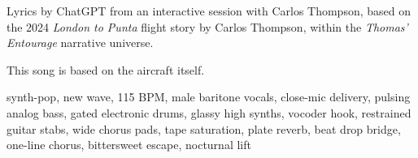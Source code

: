
\begin{notes}
Lyrics by ChatGPT from an interactive session with Carlos Thompson, %
based on the 2024 \emph{London to Punta} flight story by Carlos Thompson, within the \emph{Thomas’ Entourage} narrative universe.

This song is based on the aircraft itself.
\end{notes}
\begin{style}
synth-pop, new wave, 115 BPM, male baritone vocals, close-mic delivery, pulsing analog bass, gated electronic drums, glassy high synths, vocoder hook, restrained guitar stabs, wide chorus pads, tape saturation, plate reverb, beat drop bridge, one-line chorus, bittersweet escape, nocturnal lift
\end{style}
